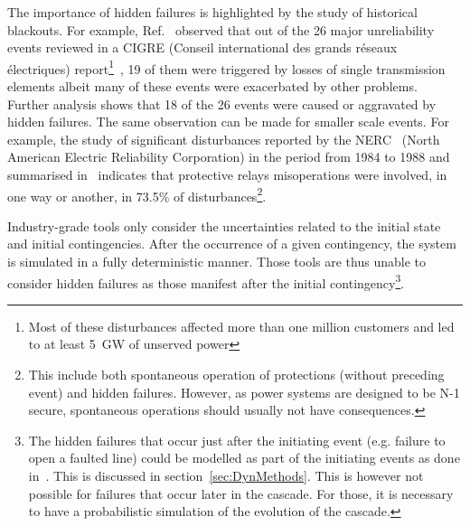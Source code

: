 

The importance of hidden failures is highlighted by the study of historical blackouts. For example, Ref.~\cite{CascadingMethodoAndChallenges} observed that out of the 26 major unreliability events reviewed in a CIGRE (Conseil international des grands réseaux électriques) report\footnote{Most of these disturbances affected more than one million customers and led to at least 5~GW of unserved power}~\cite{majorBlackouts}, 19 of them were triggered by losses of single transmission elements albeit many of these events were exacerbated by other problems. Further analysis shows that 18 of the 26 events were caused or aggravated by hidden failures. The same observation can be made for smaller scale events. For example, the study of significant disturbances reported by the NERC~\cite{NERCDisturbancesReport} (North American Electric Reliability Corporation) in the period from 1984 to 1988 and summarised in~\cite{ZoneVulnerability} indicates that protective relays misoperations were involved, in one way or another, in 73.5\% of disturbances\footnote{This include both spontaneous operation of protections (without preceding event) and hidden failures. However, as power systems are designed to be N-1 secure, spontaneous operations should usually not have consequences.}.


Industry-grade tools only consider the uncertainties related to the initial state and initial contingencies. After the occurrence of a given contingency, the system is simulated in a fully deterministic manner. Those tools are thus unable to consider hidden failures as those manifest after the initial contingency\footnote{The hidden failures that occur just after the initiating event (e.g. failure to open a faulted line) could be modelled as part of the initiating events as done in~\cite{Haarla, GridPSA}. This is discussed in section~\ref{sec:DynMethods}. This is however not possible for failures that occur later in the cascade. For those, it is necessary to have a probabilistic simulation of the evolution of the cascade.}.

